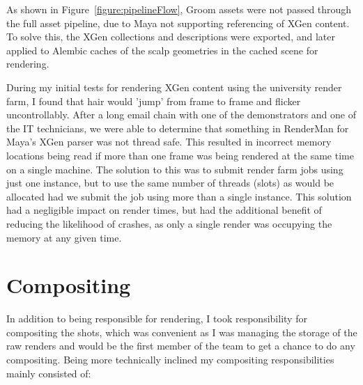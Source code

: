 \documentclass[11pt]{article}
\begin{document}
As shown in Figure~\ref{figure:pipelineFlow}, Groom assets were not passed through the full asset pipeline, due to Maya not supporting referencing of XGen content. To solve this, the XGen collections and descriptions were exported, and later applied to Alembic caches of the scalp geometries in the cached scene for rendering.

During my initial tests for rendering XGen content using the university render farm, I found that hair would 'jump' from frame to frame and flicker uncontrollably. After a long email chain with one of the demonstrators and one of the IT technicians, we were able to determine that something in RenderMan for Maya's XGen parser was not thread safe. This resulted in incorrect memory locations being read if more than one frame was being rendered at the same time on a single machine. The solution to this was to submit render farm jobs using just one instance, but to use the same number of threads (slots) as would be allocated had we submit the job using more than a single instance. This solution had a negligible impact on render times, but had the additional benefit of reducing the likelihood of crashes, as only a single render was occupying the memory at any given time.

\section{Compositing}

In addition to being responsible for rendering, I took responsibility for compositing the shots, which was convenient as I was managing the storage of the raw renders and would be the first member of the team to get a chance to do any compositing. Being more technically inclined my compositing responsibilities mainly consisted of:
\end{document}
